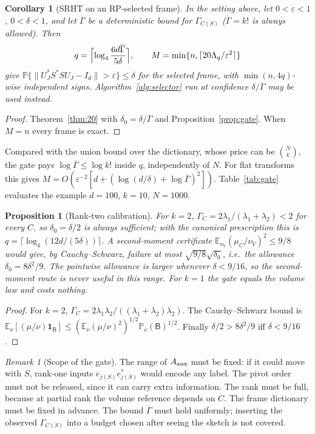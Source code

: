 \documentclass[11pt,a4paper]{article}
\newtheorem{proposition}[theorem]{Proposition}
\newtheorem{corollary}[theorem]{Corollary}
\theoremstyle{definition}
\theoremstyle{remark}
\newtheorem{remark}[theorem]{Remark}
\numberwithin{equation}{section}
\newcommand{\E}{\mathbb E}
\newcommand{\Prob}{\mathbb P}
\newcommand{\eps}{\varepsilon}
\newcommand{\norm}[1]{\lVert#1\rVert}
\begin{document}
\begin{corollary}[SRHT on an RP-selected frame]\label{cor:gate}
In the setting above, let $0<\eps<1$, $0<\delta<1$, and let $\overline\Gamma$ be a
deterministic bound for $\Gamma_{C(S)}$ ($\overline\Gamma=k!$ is always allowed). Then
\[
 q=\Bigl\lceil\log_4\frac{6d\overline\Gamma}{5\delta}\Bigr\rceil,\qquad
 M=\min\{n,\lceil20\Lambda_q/\eps^2\rceil\}
\]
give $\Prob\{\norm{U_J^*S^*SU_J-I_d}>\eps\}\le\delta$ for the selected frame,
with $\min(n,4q)$-wise independent signs. Algorithm~\ref{alg:selector} run at
confidence $\delta/\overline\Gamma$ may be used instead.
\end{corollary}
\begin{proof}
Theorem~\ref{thm:20} with $\delta_0=\delta/\overline\Gamma$ and
Proposition~\ref{prop:gate}. When $M=n$ every frame is exact.
\end{proof}

Compared with the union bound over the dictionary, whose price can be
$\binom Nk$, the gate pays $\log\overline\Gamma\le\log k!$ inside $q$,
independently of $N$. For flat transforms this gives
$M=O(\eps^{-2}[d+(\log(d/\delta)+\log\overline\Gamma)^2])$.
Table~\ref{tab:gate} evaluates the example $d=100$, $k=10$, $N=1000$.

\begin{proposition}[Rank-two calibration]\label{prop:ranktwo}
For $k=2$, $\Gamma_C=2\lambda_1/(\lambda_1+\lambda_2)<2$ for every $C$, so
$\delta_0=\delta/2$ is always sufficient; with the canonical prescription this
is $q=\lceil\log_4(12d/(5\delta))\rceil$. A second-moment certificate
$\E_{\nu_V}(\mu_C/\nu_V)^2\le9/8$ would give, by Cauchy--Schwarz, failure at
most $\sqrt{9/8}\sqrt{\delta_0}$, i.e.\ the allowance $\delta_0=8\delta^2/9$.
The pointwise allowance is larger whenever $\delta<9/16$, so the
second-moment route is never useful in this range. For $k=1$ the gate equals
the volume law and costs nothing.
\end{proposition}
\begin{proof}
For $k=2$, $\Gamma_C=2\lambda_1\lambda_2/((\lambda_1+\lambda_2)\lambda_2)$.
The Cauchy--Schwarz bound is
$\E_{\nu}[(\mu/\nu)\mathbf 1_{\mathsf B}]\le(\E_\nu(\mu/\nu)^2)^{1/2}\Prob_\nu(\mathsf B)^{1/2}$.
Finally $\delta/2>8\delta^2/9$ iff $\delta<9/16$.
\end{proof}

\begin{remark}[Scope of the gate]
The range of $A_{\rm aux}$ must be fixed: if it could move with $S$, rank-one
inputs $e_{j(S)}e_{j(S)}^*$ would encode any label. The pivot order must not be
released, since it can carry extra information. The rank must be full, because
at partial rank the volume reference depends on $C$. The frame dictionary must
be fixed in advance. The bound $\overline\Gamma$ must hold uniformly; inserting
the observed $\Gamma_{C(S)}$ into a budget chosen after seeing the sketch is not
covered.
\end{remark}
\end{document}
